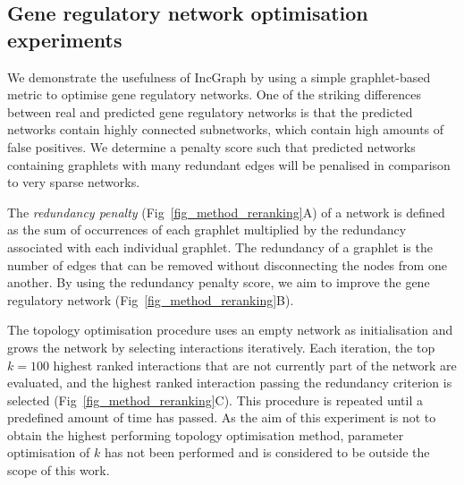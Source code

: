 \subsection*{Gene regulatory network optimisation experiments}
We demonstrate the usefulness of IncGraph by using a simple graphlet-based metric to optimise gene regulatory networks. 
One of the striking differences between real and predicted gene regulatory networks is that the predicted networks contain highly connected subnetworks, which contain high amounts of false positives.
We determine a penalty score such that predicted networks containing graphlets with many redundant edges will be penalised in comparison to very sparse networks. 

The \textit{redundancy penalty} (Fig~\ref{fig_method_reranking}A) of a network is defined as the sum of occurrences of each graphlet multiplied by the redundancy associated with each individual graphlet. The redundancy of a graphlet is the number of edges that can be removed without disconnecting the nodes from one another.
By using the redundancy penalty score, we aim to improve the gene regulatory network (Fig~\ref{fig_method_reranking}B). 

The topology optimisation procedure uses an empty network as initialisation and grows the network by selecting interactions iteratively. Each iteration, the top $k = 100$ highest ranked interactions that are not currently part of the network are evaluated, and the highest ranked interaction passing the redundancy criterion is selected (Fig~\ref{fig_method_reranking}C). This procedure is repeated until a predefined amount of time has passed.
As the aim of this experiment is not to obtain the highest performing topology optimisation method, parameter optimisation of $k$  has not been performed and is considered to be outside the scope of this work.


